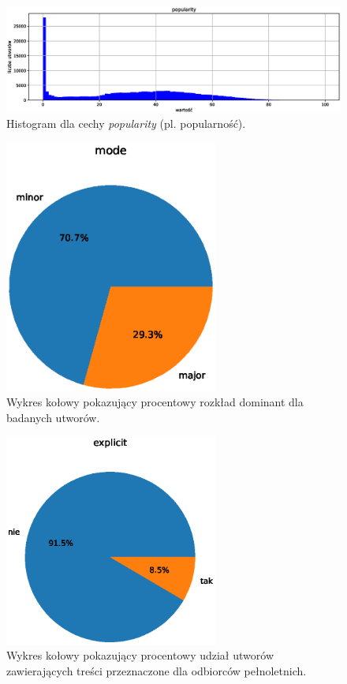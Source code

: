 \documentclass[a4paper,12pt]{article}
\numberwithin{figure}{section}
\begin{document}
    \smallskip

    \begin{figure}[H]
        \centering
        \includegraphics[width=\textwidth]{popularity}
        \caption{Histogram dla cechy \textit{popularity} (pl. popularność).}
        \label{fig:popularity}
    \end{figure}

    \smallskip

    \begin{figure}[H]
        \centering
        \includegraphics[width=7cm,keepaspectratio]{mode}
        \caption{Wykres kołowy pokazujący procentowy rozkład dominant dla badanych utworów.}
        \label{fig:mode}
    \end{figure}

    \smallskip

    \begin{figure}[H]
        \centering
        \includegraphics[width=7cm,keepaspectratio]{explicit}
        \caption{Wykres kołowy pokazujący procentowy udział utworów zawierających treści przeznaczone dla odbiorców pełnoletnich.}
        \label{fig:explicit}
    \end{figure}
\end{document}
